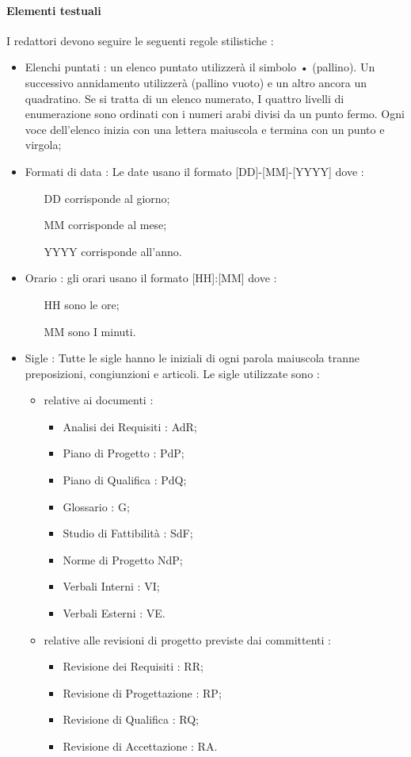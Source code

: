 \paragraph{Elementi testuali}
I redattori devono seguire le seguenti regole stilistiche :
\begin{itemize}
\item Elenchi puntati : un elenco puntato utilizzerà il simbolo • (pallino). Un successivo annidamento utilizzerà (pallino vuoto) e un altro ancora un quadratino. Se si tratta di un elenco numerato, I quattro livelli di enumerazione sono ordinati con i numeri arabi divisi da un punto fermo. Ogni voce dell’elenco inizia con una lettera maiuscola e termina con un punto e virgola;
\item Formati di data : Le date usano il formato [DD]-[MM]-[YYYY] dove :
\begin{itemize}
\item [DD] corrisponde al giorno;
\item [MM] corrisponde al mese;
\item [YYYY] corrisponde all’anno.
\end{itemize}
\item Orario : gli orari usano il formato [HH]:[MM] dove :
\begin{itemize}
\item [HH] sono le ore;
\item [MM] sono I minuti.
\end{itemize}
\item Sigle : Tutte le sigle hanno le iniziali di ogni parola maiuscola tranne preposizioni, congiunzioni e articoli. Le sigle utilizzate sono :
\begin{itemize}
\item relative ai documenti :
\begin{itemize}
\item Analisi dei Requisiti : AdR;
\item Piano di Progetto : PdP;
\item Piano di Qualifica : PdQ;
\item Glossario : G;
\item Studio di Fattibilità : SdF;
\item Norme di Progetto NdP;
\item Verbali Interni : VI;
\item Verbali Esterni : VE.
\end{itemize}

\item relative alle revisioni di progetto previste dai committenti :
\begin{itemize}
\item Revisione dei Requisiti : RR;
\item Revisione di Progettazione : RP;
\item Revisione di Qualifica : RQ;
\item Revisione di Accettazione : RA.
\end{itemize}


\end{itemize}
\end{itemize}
